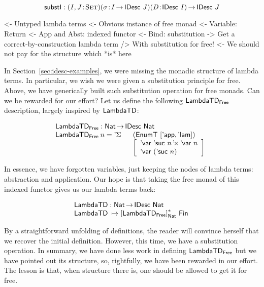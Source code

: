 \[
\substI : \PITEL{\V{I}, \V{J}}{\Set}
          \PITEL{\sigma}{\V{I} \To \IDesc{\V{J}}}
          \PITEL{\V{D}}{\IDesc{I}} \To
          \IDesc{J}
\]


\begin{wstructure}
<- Untyped lambda terms
    <- Obvious instance of free monad
        <- Variable: Return
        <- App and Abst: indexed functor
        <- Bind: substitution
    -> Get a correct-by-construction lambda term
        /> With substitution for free!
        <- We should not pay for the structure which *is* here
\end{wstructure}

In Section~\ref{sec:idesc-examples}, we were missing the monadic
structure of lambda terms. In particular, we wish we were given a
substitution principle for free. Above, we have generically built such
substitution operation for free monads. Can we be rewarded for our
effort? Let us define the following $\LambdaTFreeD$ description,
largely inspired by $\LambdaTD$:

\[\stk{
\LambdaTFreeD : \Nat \To \IDesc{\Nat} \\
\begin{array}{@{}ll}
\LambdaTFreeD\: n = \DSigma{}{} & (\EnumT [ \LambdaTApp, \LambdaTLam ]) \\
                                & \left[\begin{array}{l}
                                  \DProd{\DVar{\NatSuc{n}}}{\DVar{n}} \\
                                  \DVar{(\NatSuc{n})}
                                  \end{array}\right]
\end{array}
}\]

In essence, we have forgotten variables, just keeping the nodes of
lambda terms: abstraction and application. Our hope is that taking the
free monad of this indexed functor gives us our lambda terms back:


\[\stk{
\LambdaTD : \Nat \To \IDesc{\Nat} \\
\LambdaTD\: \mapsto \FreeIMonad{[\LambdaTFreeD]}{\Nat}{\Fin{}}
}\]

By a straightforward unfolding of definitions, the reader will
convince herself that we recover the initial definition. However, this
time, we have a substitution operation. In summary, we have done less
work in defining $\LambdaTFreeD$ but we have pointed out its
structure, so, rightfully, we have been rewarded in our effort. The
lesson is that, when structure there is, one should be allowed to get
it for free.

